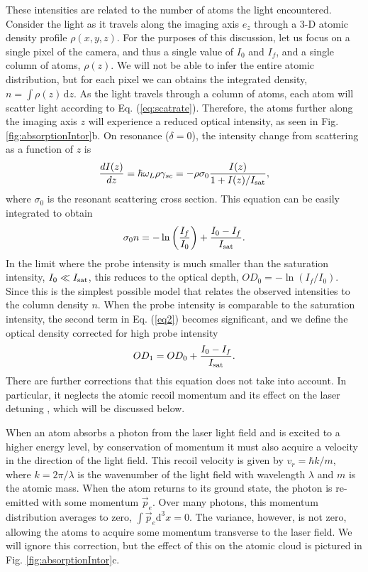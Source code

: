 \documentclass[12pt]{iopart}
\begin{document}
\par These intensities are related to the number of atoms the light encountered. Consider the light as it travels along the imaging axis $e_z$ through a 3-D atomic density profile $\rho(x,y,z)$. For the purposes of this discussion, let us focus on a single pixel of the camera, and thus a single value of $I_0$ and $I_f$, and a single column of atoms, $\rho(z)$. We will not be able to infer the entire atomic distribution, but for each pixel we can obtains the integrated density, $n = \int \rho\left(z\right) \,\mathrm{d}z$. As the light travels through a column of atoms, each atom will scatter light according to Eq. (\ref{eq:scatrate}). Therefore, the atoms further along the imaging axis $z$ will experience a reduced optical intensity, as seen in Fig. \ref{fig:absorptionIntor}b. On resonance ($\delta=0$), the intensity change from scattering as a function of $z$ is
\begin{equation}
\frac{dI(z)}{dz}=\hbar\omega_L\rho\gamma_{sc}=-\rho\sigma_0\frac{I(z)}{1+I(z)/I_{\rm{sat}}},
\end{equation}
where $\sigma_0$ is the resonant scattering cross section. 
 This equation can be easily integrated to obtain  \cite{Reinaudi07}
\begin{equation} 
\sigma_0 n = -\ln\left(\frac{I_f}{I_0}\right) + \frac{I_0-I_f}{I_{\rm{sat}}}.
\label{eq2}
\end{equation}
In the limit where the probe intensity is much smaller than the saturation intensity, $I_0\ll I_{\rm{sat}}$, this reduces to the optical depth, $OD_0=-\ln \left(I_f/I_0\right)$. Since this is the simplest possible model that relates the observed intensities to the column density $n$. When the probe intensity is comparable to the saturation intensity, the second term in Eq. (\ref{eq2}) becomes significant, and we define the optical density corrected for high probe intensity
\begin{equation} 
OD_1 = OD_0 + \frac{I_0-I_f}{I_{\rm{sat}}}.
\label{eq:OD1}
\end{equation}
There are further corrections that this equation does not take into account. In particular, it neglects the atomic recoil momentum and its effect on the laser detuning \cite{Konstantinidis12}, which will be discussed below.
\par When an atom absorbs a photon from the laser light field and is excited to a higher energy level, by conservation of momentum it must also acquire a velocity in the direction of the light field. This recoil velocity is given by $v_r=\hbar k/m$, where $k=2\pi/\lambda$ is the wavenumber of the light field with wavelength $\lambda$ and $m$ is the atomic mass. When the atom returns to its ground state, the photon is re-emitted with some momentum $\vec{p}_e$. Over many photons, this momentum distribution averages to zero, $\int\vec{p}_e\mathrm{d}^3 x=0$.  The variance, however, is not zero, allowing the atoms to acquire some momentum transverse to the laser field. We will ignore this correction, but the effect of this on the atomic cloud is pictured in Fig. \ref{fig:absorptionIntor}c. 
\end{document}
